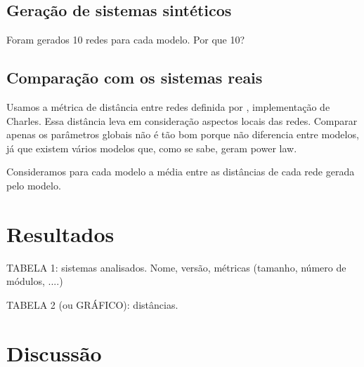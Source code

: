 \documentclass{acm_proc_article-sp}
\begin{document}
\subsection{Geração de sistemas sintéticos}

Foram gerados 10 redes para cada modelo. Por que 10?

\subsection{Comparação com os sistemas reais}

Usamos a métrica de distância entre redes definida por \cite{Andrade2008}, implementação de Charles. Essa distância leva em consideração aspectos locais das redes. Comparar apenas os parâmetros globais não é tão bom porque não diferencia entre modelos, já que existem vários modelos que, como se sabe, geram power law.


Consideramos para cada modelo a média entre as distâncias de cada rede gerada pelo modelo.


\section{Resultados} %

TABELA 1: sistemas analisados. Nome, versão, métricas (tamanho, número de módulos, ....)

TABELA 2 (ou GRÁFICO): distâncias.


\section{Discussão} %


\end{document}
